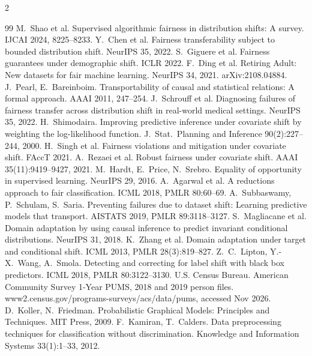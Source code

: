 \documentclass[11pt,a4paper]{article}
\begin{document}
\begin{multicols}{2}\footnotesize
\begin{thebibliography}{99}\setlength{\itemsep}{0pt}\setlength{\parskip}{0pt}
 M.~Shao et al. Supervised algorithmic fairness in distribution shifts:
A survey. IJCAI 2024, 8225--8233.
 Y.~Chen et al. Fairness transferability subject to bounded distribution shift.
NeurIPS 35, 2022.
 S.~Giguere et al. Fairness guarantees
under demographic shift. ICLR 2022.
 F.~Ding et al. Retiring Adult: New datasets for fair machine learning.
NeurIPS 34, 2021. arXiv:2108.04884.
 J.~Pearl, E.~Bareinboim. Transportability of causal and statistical relations: A formal approach. AAAI
2011, 247--254.
 J.~Schrouff et al. Diagnosing failures of fairness transfer across distribution
shift in real-world medical settings. NeurIPS 35, 2022.
 H.~Shimodaira. Improving predictive inference under covariate shift by weighting the
log-likelihood function. J.\ Stat.\ Planning and Inference 90(2):227--244, 2000.
 H.~Singh et al. Fairness violations and mitigation under covariate shift.
FAccT 2021.
 A.~Rezaei et al. Robust fairness under covariate shift. AAAI
35(11):9419--9427, 2021.
 M.~Hardt, E.~Price, N.~Srebro. Equality of opportunity in supervised learning. NeurIPS 29, 2016.
 A.~Agarwal et al. A reductions approach to fair
classification. ICML 2018, PMLR 80:60--69.
 A.~Subbaswamy, P.~Schulam, S.~Saria. Preventing failures due to dataset shift: Learning
predictive models that transport. AISTATS 2019, PMLR 89:3118--3127.
 S.~Magliacane et al. Domain adaptation
by using causal inference to predict invariant conditional distributions. NeurIPS 31, 2018.
 K.~Zhang et al. Domain adaptation under target and conditional shift.
ICML 2013, PMLR 28(3):819--827.
 Z.~C.~Lipton, Y.-X.~Wang, A.~Smola. Detecting and correcting for label shift with black box
predictors. ICML 2018, PMLR 80:3122--3130.
 U.S. Census Bureau. American Community Survey 1-Year PUMS, 2018 and 2019 person files.
www2.census.gov/programs-surveys/acs/data/pums, accessed Nov 2026.
 D.~Koller, N.~Friedman. Probabilistic Graphical Models: Principles and Techniques. MIT Press, 2009.
 F.~Kamiran, T.~Calders. Data preprocessing techniques for classification without discrimination.
Knowledge and Information Systems 33(1):1--33, 2012.
\end{thebibliography}
\end{multicols}
\end{document}

